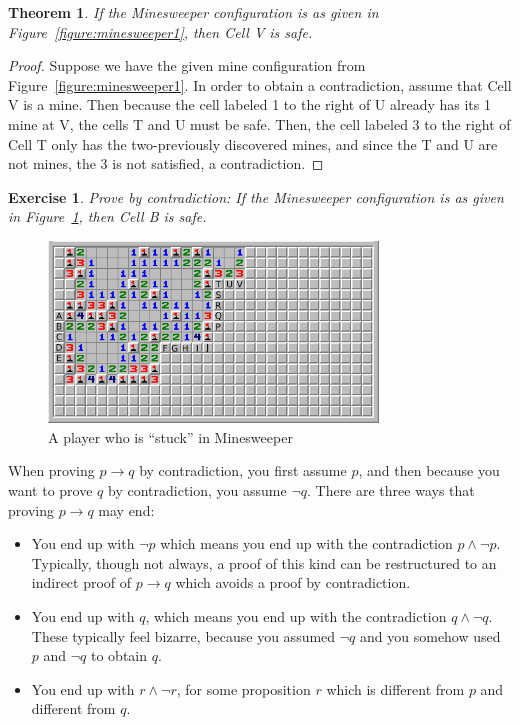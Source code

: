 \documentclass{book}
\newcounter{ekcounter}%
\theoremstyle{ekimcustom}
\newtheorem{theorem}[ekcounter]{Theorem}
\newtheorem{exercise}[ekcounter]{Exercise}
\begin{document}
\begin{theorem}\label{theorem:minesweeper1-V-safe-contradiction}
If the Minesweeper configuration is as given in Figure~\ref{figure:minesweeper1}, then Cell V is safe.
\end{theorem}
\begin{proof}
Suppose we have the given mine configuration from Figure~\ref{figure:minesweeper1}. In order to obtain a contradiction, assume that Cell V is a mine. Then because the cell labeled 1 to the right of U already has its 1 mine at V, the cells T and U must be safe. Then, the cell labeled 3 to the right of Cell T only has the two-previously discovered mines, and since the T and U are not mines, the 3 is not satisfied, a contradiction.
\end{proof}

\begin{exercise}
Prove by contradiction: If the Minesweeper configuration is as given in Figure~\ref{figure:minesweeper2}, then Cell B is safe.
\end{exercise}
\begin{figure}[hbt]
\begin{center}
\includegraphics[width=0.78\textwidth]{minesweeper-gameB-labeled}
\end{center}
\caption{A player who is ``stuck'' in Minesweeper}\label{figure:minesweeper2}
\end{figure}

When proving $p \to q$ by contradiction, you first assume $p$, and then because you want to prove $q$ by contradiction, you assume $\neg q$. There are three ways that proving $p \to q$ may end:
\begin{itemize}
\item You end up with $\neg p$ which means you end up with the contradiction $p \wedge \neg p$. Typically, though not always, a proof of this kind can be restructured to an indirect proof of $p \to q$ which avoids a proof by contradiction.
\item You end up with $q$, which means you end up with the contradiction $q \wedge \neg q$. These typically feel bizarre, because you assumed $\neg q$ and you somehow used $p$ and $\neg q$ to obtain $q$.
\item You end up with $r \wedge \neg r$, for some proposition $r$ which is different from $p$ and different from $q$.
\end{itemize}
\end{document}
